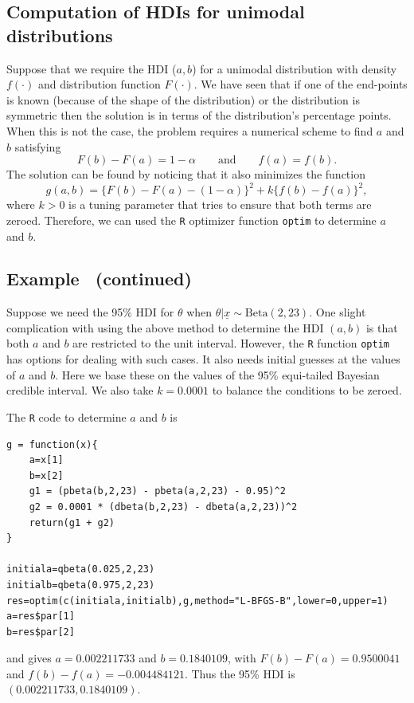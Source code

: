 {\subsection*{Computation of HDIs for unimodal distributions}
Suppose that we require the HDI ($a,b$) for a unimodal distribution
with density $f(\cdot)$ and distribution function $F(\cdot)$.  We have
seen that if one of the end-points is known (because of the shape of
the distribution) or the distribution is symmetric then the solution
is in terms of the distribution's percentage points. When this is not
the case, the problem requires a numerical scheme to find $a$ and
$b$ satisfying
$$
F(b)-F(a)=1-\alpha \quad\quad\text{and}\quad\quad f(a)=f(b).
$$
The solution can be found by noticing that it also minimizes the
function
$$
g(a,b)=\bigl\{F(b)-F(a)-(1-\alpha)\bigr\}^2+k\bigl\{f(b)-f(a)\bigr\}^2,
$$
where $k>0$ is a tuning parameter that tries to ensure that both terms
are zeroed.  Therefore, we can used the \texttt{R} optimizer function
\texttt{optim} to determine $a$ and $b$.

\subsection*{Example~ (continued)}
Suppose we need the 95\% HDI for $\theta$ when $\theta|\underline{x}\sim \mathrm{Beta}(2,23)$. One slight complication with using the above method to determine the HDI $(a,b)$ is that both $a$ and $b$ are restricted to the unit interval. However, the \texttt{R} function \texttt{optim} has options for dealing with such cases. It also needs initial guesses at the values of $a$ and $b$. Here we base these on the values of the 95\% equi-tailed Bayesian credible interval. We also take $k=0.0001$ to balance the conditions to be zeroed.

The \texttt{R} code to determine $a$ and $b$ is 
\begin{verbatim}
g = function(x){
    a=x[1]
    b=x[2]
    g1 = (pbeta(b,2,23) - pbeta(a,2,23) - 0.95)^2
    g2 = 0.0001 * (dbeta(b,2,23) - dbeta(a,2,23))^2
    return(g1 + g2)
}

initiala=qbeta(0.025,2,23)
initialb=qbeta(0.975,2,23)
res=optim(c(initiala,initialb),g,method="L-BFGS-B",lower=0,upper=1)
a=res$par[1] 
b=res$par[2]
\end{verbatim}
and gives $a=0.002211733$ and $b=0.1840109$, with $F(b)-F(a)=0.9500041$ and $f(b)-f(a)=-0.004484121$. Thus the 95\% HDI is $(0.002211733,0.1840109)$.}



